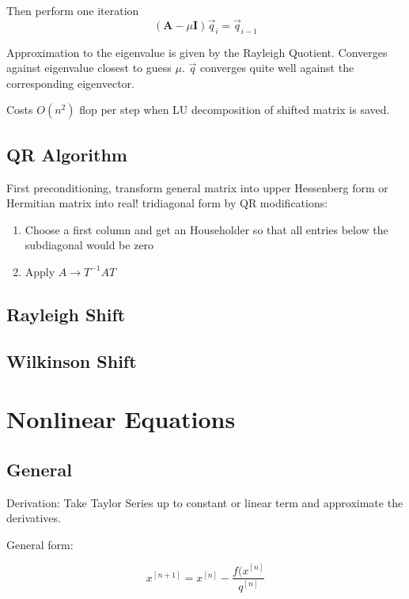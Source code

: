 \documentclass[
    a4paper,
    11pt
]{article}
\begin{document}
Then perform one iteration
\begin{equation}
    (\mathbf{A} - \mu \mathbf{I})\vec{q}_{i} = \vec{q}_{i-1}
\end{equation}

Approximation to the eigenvalue is given by the Rayleigh Quotient. Converges
against eigenvalue closest to guess $\mu$. $\vec{q}$ converges quite well
against the corresponding eigenvector.

Costs $O(n^2)$ flop per step when LU decomposition of shifted matrix is saved.

\subsection{QR Algorithm}

First preconditioning, transform general matrix into upper Hessenberg form or
Hermitian matrix into real! tridiagonal form by QR modifications:
\begin{enumerate}
    \item Choose a first column and get an Householder so that all entries below
        the subdiagonal would be zero
    \item Apply $A \to T^{-1}AT$
\end{enumerate}


\subsection{Rayleigh Shift}

\subsection{Wilkinson Shift}

\section{Nonlinear Equations}

\subsection{General}
Derivation: Take Taylor Series up to constant or linear term and approximate the
derivatives.

General form:

\begin{equation}
    x^{[n+1]} = x^{[n]} - \frac{f(x^{[n]}}{q^{[n]}}
\end{equation}
\end{document}
